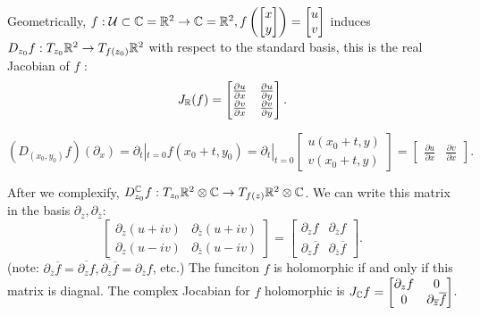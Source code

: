 Geometrically, $f:\mathcal{U}\subset \mathbb{C}=\mathbb{R}^{2}\to \mathbb{C}=\mathbb{R}^{2}, f\left( \begin{bmatrix} x\\y \end{bmatrix}  \right)=\begin{bmatrix} u\\v \end{bmatrix}  $ induces $D_{z_0}f:T_{z_0}\mathbb{R}^2\to T_{f(z_0)}\mathbb{R}^2$ with respect to the standard basis, this is the real Jacobian of $f$ :
\[
  J_{\mathbb{R}}(f)=\begin{bmatrix} \frac{\partial u}{\partial x} &\frac{\partial u}{\partial y} \\ \frac{\partial v}{\partial x} &\frac{\partial v}{\partial y}  \end{bmatrix} .
\] 
\begin{example}
  \[
    \left( D_{(x_0,y_0)}f \right) \left( \partial_x \right) =\partial_t |_{t=0}f(x_0+t,y_0)=\partial_t|_{t=0}\begin{bmatrix} u(x_0+t,y)\\v(x_0+t,y) \end{bmatrix} =\begin{bmatrix} \frac{\partial u}{\partial x} &\frac{\partial v}{\partial x}  \end{bmatrix} 
  .\] 
\end{example}
After we complexify, $D_{z_0}^{\mathbb{C}}f:T_{z_0}\mathbb{R}^{2}\otimes \mathbb{C}\to T_{f(z)}\mathbb{R}^{2}\otimes \mathbb{C}$. We can write this matrix in the basis $\partial_z,\partial_{\overline{z}}$:
\[
  \begin{bmatrix} \partial_z(u+iv) &\partial_{\overline{z}}(u+iv)\\ 
  \partial_z(u-iv) & \partial_{\overline{z}}(u-iv)\end{bmatrix}
  = \begin{bmatrix} 
  \partial_z f & \partial_{\overline{z}}f\\
\partial_z \overline{f}&\partial_{\overline{z}}\overline{f}\end{bmatrix} 
.\] 
(note: $\partial_{\overline{z}}\overline{f}=\overline{\partial_z f}, \overline{\partial_z \overline{f}}=\partial_{\overline{z}}f$, etc.)
The funciton $f$ is holomorphic if and only if this matrix is diagnal. The complex Jocabian for $f$ holomorphic is $J_{\mathbb{C}}f=\begin{bmatrix} \partial_z f & 0\\ 0 & \partial_{\overline{z}}\overline{f} \end{bmatrix} $.


